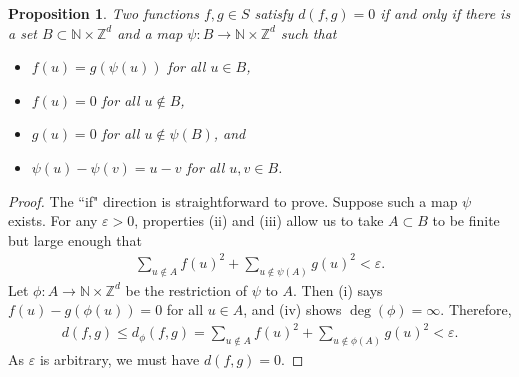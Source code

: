 \documentclass[11pt,reqno]{amsart}
\numberwithin{equation}{section}
\newtheorem{prop}[thm]{Proposition}
\theoremstyle{definition}
\begin{document}
\begin{prop} \label{superisometry}
Two functions $f,g \in S$ satisfy $d(f,g) = 0$ if and only if
there is a set $B\subset {\mathbb{N}} \times {\mathbb{Z}}^d$ and a map $\psi : B \to {\mathbb{N}} \times {\mathbb{Z}}^d$ such that 
\begin{itemize}
\item[(i)] $f(u) = g(\psi(u))$ for all $u \in B$,
\item[(ii)] $f(u) = 0$ for all $u \notin B$,
\item[(iii)] $g(u) = 0$ for all $u \notin \psi(B)$, and
\item[(iv)] $\psi(u) - \psi(v) = u - v$ for all $u,v \in B$.
\end{itemize}
\end{prop}

\begin{proof}
The ``if" direction is straightforward to prove.
Suppose such a map $\psi$ exists.
For any ${\varepsilon} > 0$, properties (ii) and (iii) allow us to take $A \subset B$ to be finite but large enough that
{\begin{align*} {
\sum_{u \notin A} f(u)^2 + \sum_{u \notin \psi(A)} g(u)^2 < {\varepsilon}. 
} \end{align*}}
Let $\phi: A \to {\mathbb{N}} \times {\mathbb{Z}}^d$ be the restriction of $\psi$ to $A$.
Then (i) says $f(u) - g(\phi(u)) = 0$ for all $u \in A$, and (iv) shows $\deg(\phi) = \infty$.
Therefore, 
{\begin{align*} {
d(f,g) \leq d_\phi(f,g) = \sum_{u \notin A} f(u)^2 + \sum_{u \notin \phi(A)} g(u)^2 < {\varepsilon}.
} \end{align*}}
As ${\varepsilon}$ is arbitrary, we must have $d(f,g) = 0$.


\end{proof}
\end{document}
